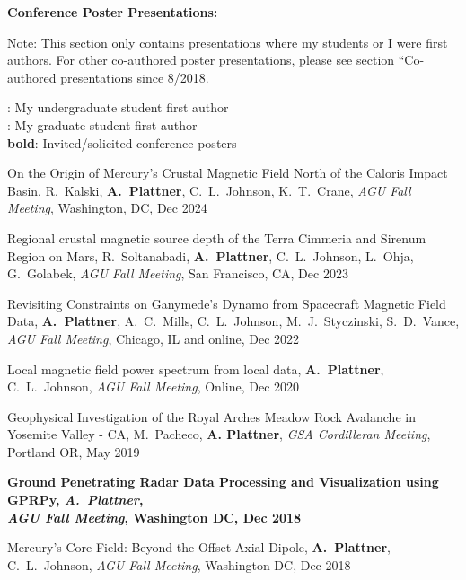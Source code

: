 \documentclass[10pt]{article}
\begin{document}
\spc
\textbf{\tsize Conference Poster Presentations:}

\vspace{0.2cm}
Note: This section only contains presentations where my students or I were first authors. For other co-authored poster presentations, please see section ``Co-authored presentations since 8/2018.


\spcp
\ug: My undergraduate student first author\\
\gr: My graduate student first author\\
\textbf{bold}: Invited/solicited conference posters


\spcp
\hspace*{-0.4cm} \gr \hspace*{-0.05cm} On the Origin of Mercury's Crustal
Magnetic Field North of the Caloris Impact Basin, R.\ Kalski,
\textbf{A.\ Plattner}, C.~L.~Johnson, K.\ T.\ Crane, \emph{AGU Fall
Meeting}, Washington, DC, Dec 2024

\spcp
\hspace*{-0.35cm} \gr \hspace*{0.02cm} Regional crustal magnetic source depth of the Terra Cimmeria and Sirenum Region on Mars, R.~Soltanabadi, \textbf{A.~Plattner}, C.~L.~Johnson, L.~Ohja, G.~Golabek, \emph{AGU Fall Meeting}, San Francisco, CA, Dec 2023 

\spcp
Revisiting Constraints on Ganymede's Dynamo from Spacecraft Magnetic Field Data,
\textbf{A.~Plattner}, A.~C.~Mills, C.~L.~Johnson, M.~J.~Styczinski, S.~D.~Vance,  \emph{AGU Fall Meeting}, Chicago, IL and online, Dec 2022 

\spcp
Local magnetic field power spectrum from local data,
\textbf{A.~Plattner}, C.~L.~Johnson, 
\emph{AGU Fall Meeting}, Online, Dec 2020 

\spcp
\hspace*{-0.35cm} \gr \hspace*{0.05cm} Geophysical Investigation of the Royal Arches Meadow Rock
Avalanche in Yosemite Valley - CA,
M.~Pacheco, \textbf{A. Plattner},
\emph{GSA Cordilleran Meeting}, Portland OR, May 2019

\spcp
\textbf{Ground Penetrating Radar Data Processing and Visualization using
GPRPy,
\emph{A.~Plattner},\\
\emph{AGU Fall Meeting}, Washington DC, Dec 2018}

\spcp
Mercury's Core Field: Beyond the Offset Axial Dipole,
\textbf{A.~Plattner}, C.~L.~Johnson, 
\emph{AGU Fall Meeting}, Washington DC, Dec 2018 
\end{document}
